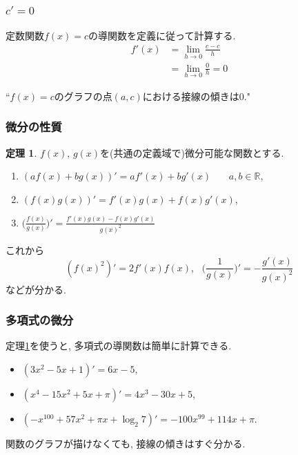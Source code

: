 \documentclass[dvipdfmx,cjk,10.2pt]{beamer}
\newcommand{\R}{\mathbb{R}}
\theoremstyle{definition}
\newtheorem{Thm}{定理}[section]
\begin{document}


\begin{frame}
\frametitle{$c'=0$}

定数関数$f(x)=c$の導関数を定義に従って計算する. 
\begin{align*}
f'(x) & = \lim_{h\to 0} \frac{c-c}{h} \\
& = \lim_{h\to 0}\frac{0}{h}=0
\end{align*}

``$f(x)=c$のグラフの点$(a,c)$における接線の傾きは$0$." 

\end{frame}





\begin{frame}
\frametitle{微分の性質}

\begin{Thm} \label{微分定理}
$f(x)$, $g(x)$を(共通の定義域で)微分可能な関数とする. \vspace{1mm}
\begin{enumerate}
\item $(af(x)+bg(x))'=af'(x)+bg'(x)$ \ \ \ $a,b \in \R$, \vspace{1mm}
\item $(f(x)g(x))'=f'(x)g(x)+f(x)g'(x)$, \vspace{1mm}
\item $\Big(\frac{f(x)}{g(x)}\Big)'=\frac{f'(x)g(x)-f(x)g'(x)}{g(x)^2}$
\end{enumerate}
\end{Thm}
これから
$$
(f(x)^2)'=2f'(x)f(x), \ \ \ \Big(\frac{1}{g(x)}\Big)'=-\frac{g'(x)}{g(x)^2}
$$
などが分かる. 

\end{frame}






\begin{frame}
\frametitle{多項式の微分}

定理\ref{微分定理}を使うと, 多項式の導関数は簡単に計算できる.  

\begin{itemize}
\item $(3x^2-5x+1)'=6x-5$, 
\item $(x^4-15x^2+5x+\pi)'=4x^3-30x+5$, 
\item $(-x^{100}+57x^{2}+\pi x+ \log_2 7)'=-100x^{99}+114x+\pi$. 
\end{itemize}

関数のグラフが描けなくても, 接線の傾きはすぐ分かる. 

\end{frame}
\end{document}
